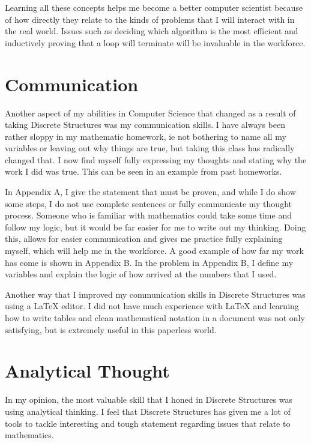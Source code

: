 \documentclass{article}
\begin{document}
Learning all these concepts helps me become a better computer scientist because of how directly they relate to the kinds of problems that I will interact with in the real world. Issues such as deciding which algorithm is the most efficient and inductively proving that a loop will terminate will be invaluable in the workforce.

\section*{Communication}

Another aspect of my abilities in Computer Science that changed as a result of taking Discrete Structures was my communication skills. I have always been rather sloppy in my mathematic homework, ie not bothering to name all my variables or leaving out why things are true, but taking this class has radically changed that. I now find myself fully expressing my thoughts and stating why the work I did was true. This can be seen in an example from past homeworks.

In Appendix A, I give the statement that must be proven, and while I do show some steps, I do not use complete sentences or fully communicate my thought process. Someone who is familiar with mathematics could take some time and follow my logic, but it would be far easier for me to write out my thinking. Doing this, allows for easier communication and gives me practice fully explaining myself, which will help me in the workforce. A good example of how far my work has come is shown in Appendix B. In the problem in Appendix B, I define my variables and explain the logic of how arrived at the numbers that I used.

Another way that I improved my communication skills in Discrete Structures was using a LaTeX editor. I did not have much experience with LaTeX and learning how to write tables and clean mathematical notation in a document was not only satisfying, but is extremely useful in this paperless world.

\section*{Analytical Thought}

In my opinion, the most valuable skill that I honed in Discrete Structures was using analytical thinking. I feel that Discrete Structures has given me a lot of tools to tackle interesting and tough statement regarding issues that relate to mathematics.
\end{document}
